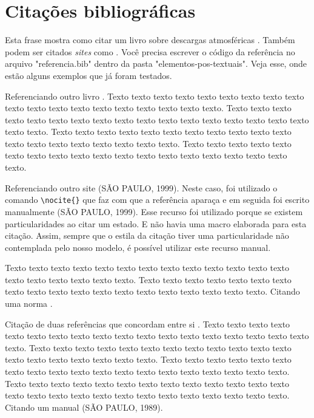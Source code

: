 \section{Citações bibliográficas}\label{sec:citacoes}

    Esta frase mostra como citar um livro sobre descargas atmosféricas \cite{rakov2003lightning}. Também podem ser citados \textit{sites} como . Você precisa escrever o código da referência no arquivo "referencia.bib" dentro da pasta "elementos-pos-textuais". Veja esse, onde estão alguns exemplos que já foram testados.        

    Referenciando outro livro \cite{LangtangenLogg2017}. Texto texto texto texto texto texto texto texto texto texto texto texto texto texto texto texto texto texto texto. Texto texto texto texto texto texto texto texto texto texto texto texto texto texto texto texto texto texto texto. Texto texto texto texto texto texto texto texto texto texto texto texto texto texto texto texto texto texto texto. Texto texto texto texto texto texto texto texto texto texto texto texto texto texto texto texto texto texto texto.

    Referenciando outro site \nocite{secretaria1999}(SÃO PAULO, 1999). Neste caso, foi utilizado o comando \verb=\nocite{}=
    que faz com que a referência aparaça e em seguida foi escrito manualmente (SÃO PAULO, 1999). Esse recurso foi utilizado porque se existem particularidades ao citar um estado. E não havia uma macro elaborada para esta citação. Assim, sempre que o estila da citação tiver uma particularidade não contemplada pelo nosso modelo, é possível utilizar este recurso manual.
    
    Texto texto texto texto texto texto texto texto texto texto texto texto texto texto texto texto texto texto texto. Texto texto texto texto texto texto texto texto texto texto texto texto texto texto texto texto texto texto texto. Citando uma norma \cite{NBR10520:2002}.
        
    Citação de duas referências que concordam entre si \cite{Almeida2018,Gondim2017}. Texto texto texto texto texto texto texto texto texto texto texto texto texto texto texto texto texto texto texto. Texto texto texto texto texto texto texto texto texto texto texto texto texto texto texto texto texto texto texto. Texto texto texto texto texto texto texto texto texto texto texto texto texto texto texto texto texto texto texto. Texto texto texto texto texto texto texto texto texto texto texto texto texto texto texto texto texto texto texto texto texto texto texto texto texto texto. Citando um manual \nocite{manuais1989}(SÃO PAULO, 1989). 
        
